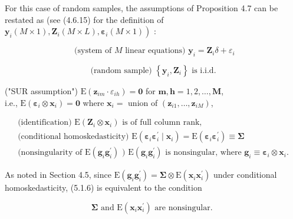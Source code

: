 \documentclass[10pt]{article}
\begin{document}
For this case of random samples, the assumptions of Proposition 4.7 can be restated as (see (4.6.15) for the definition of $\left.\mathbf{y}_{i}(M \times 1), \mathbf{Z}_{i}(M \times L), \boldsymbol{\varepsilon}_{i}(M \times 1)\right)$ :


\begin{equation*}
\text { (system of } M \text { linear equations) } \mathbf{y}_{i}=\mathbf{Z}_{i} \delta+\varepsilon_{i} \tag{5.1.1}
\end{equation*}



\begin{equation*}
\text { (random sample) }\left\{\mathbf{y}_{i}, \mathbf{Z}_{i}\right\} \text { is i.i.d. } \tag{5.1.2}
\end{equation*}


("SUR assumption") $\mathrm{E}\left(\mathbf{z}_{i m} \cdot \varepsilon_{i h}\right)=\mathbf{0}$ for $\boldsymbol{m}, \boldsymbol{h}=1,2, \ldots, \boldsymbol{M}$,\\
i.e., $\mathrm{E}\left(\boldsymbol{\varepsilon}_{i} \otimes \mathbf{x}_{i}\right)=\mathbf{0}$ where $\mathbf{x}_{i}=$ union of $\left(\mathbf{z}_{i 1}, \ldots, \mathbf{z}_{i M}\right)$,


\begin{gather*}
\text { (identification) } \mathrm{E}\left(\mathbf{Z}_{i} \otimes \mathbf{x}_{i}\right) \text { is of full column rank, }  \tag{5.1.4}\\
\text { (conditional homoskedasticity) } \mathrm{E}\left(\boldsymbol{\varepsilon}_{i} \boldsymbol{\varepsilon}_{i}^{\prime} \mid \mathbf{x}_{i}\right)=\mathrm{E}\left(\boldsymbol{\varepsilon}_{i} \boldsymbol{\varepsilon}_{i}^{\prime}\right) \equiv \mathbf{\Sigma}  \tag{5.1.5}\\
\text { (nonsingularity of } \mathrm{E}\left(\mathbf{g}_{i} \mathbf{g}_{i}^{\prime}\right) \text { ) } \mathrm{E}\left(\mathbf{g}_{i} \mathbf{g}_{i}^{\prime}\right) \text { is nonsingular, where } \mathbf{g}_{i} \equiv \boldsymbol{\varepsilon}_{i} \otimes \mathbf{x}_{i} \text {. } \tag{5.1.6}
\end{gather*}


As noted in Section 4.5, since $\mathrm{E}\left(\mathbf{g}_{i} \mathbf{g}_{i}^{\prime}\right)=\mathbf{\Sigma} \otimes \mathrm{E}\left(\mathbf{x}_{i} \mathbf{x}_{i}^{\prime}\right)$ under conditional homoskedasticity, (5.1.6) is equivalent to the condition


\begin{equation*}
\boldsymbol{\Sigma} \text { and } \mathrm{E}\left(\mathbf{x}_{i} \mathbf{x}_{i}^{\prime}\right) \text { are nonsingular. } \tag{5.1.6'}
\end{equation*}
\end{document}
